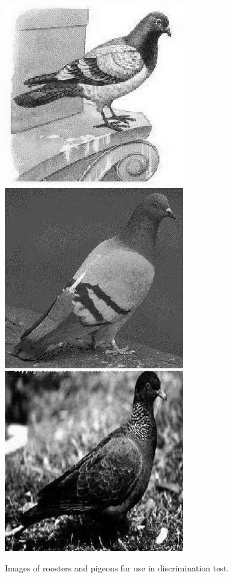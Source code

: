 \begin{figure}
      \includegraphics[scale=.2]{pigeonrs-image_0001.jpg}
      \includegraphics[scale=.2]{pigeonrs-image_0002.jpg} 
      \includegraphics[scale=.2]{pigeonrs-image_0004.jpg} 
      \caption{Images of roosters and pigeons for use in
        discrimination test.}
  \label{fig:birds}
\end{figure}

